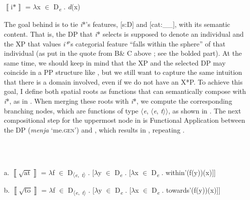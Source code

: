 \documentclass[output=paper,modfonts,nonflat]{langsci/langscibook}
\begin{document}
\ea%
    \label{ex:key:19}
    \gll\\
        \\
    \glt
    \z

           $\left\llbracket \text{i*}\right\rrbracket $ = ${\lambda}$x ${\in}$ D\textit{\textsubscript{e}} . \textit{d}(x)

The goal behind  is to tie \textit{i}*’s features, [s:D] and [cat:\_\_], with its semantic content. That is, the DP that \textit{i}* selects is supposed to denote an individual and the XP that values \textit{i*}’s categorial feature “falls within the sphere” of that individual (as put in the quote from B\& C above ; see the bolded part). At the same time, we should keep in mind that the XP and the selected DP may coincide in a PP structure like , but we still want to capture the same intuition that there is a domain involved, even if we do not have an X*P. To achieve this goal, I define both spatial roots as functions that can semantically compose with \textit{i}*, as in . When merging these roots with \textit{i}*, we compute the corresponding branching nodes, which are functions of type ${\langle}$\textit{e}, ${\langle}$\textit{e}, \textit{t}${\rangle}{\rangle}$, as shown in . The next compositional step for the uppermost node in  is Functional Application between the DP (\textit{menja} ‘me.\textsc{gen}’) and , which results in , repeating . 

\ea%
    \label{ex:key:20}
    \gll\\
        \\
    \glt
    \z

          a.   $\left\llbracket \sqrt{\text{at}}\right\rrbracket $ = ${\lambda}$f ${\in}$ D\textsubscript{${\langle}$}\textit{\textsubscript{e}}\textsubscript{,} \textit{\textsubscript{t}}\textsubscript{${\rangle}$} . [${\lambda}$y ${\in}$ D\textit{\textsubscript{e}} . [${\lambda}$x ${\in}$ D\textit{\textsubscript{e}} . within'(f(y))(x)]]         

  b.   $\left\llbracket \sqrt{\text{to}}\right\rrbracket $ = ${\lambda}$f ${\in}$ D\textsubscript{${\langle}$}\textit{\textsubscript{e}}\textsubscript{,} \textit{\textsubscript{t}}\textsubscript{${\rangle}$} . [${\lambda}$y ${\in}$ D\textit{\textsubscript{e}} . [${\lambda}$x ${\in}$ D\textit{\textsubscript{e}} . towards'(f(y))(x)]]

\ea%
    \label{ex:key:21}
    \gll\\
        \\
    \glt
    \z
\end{document}
